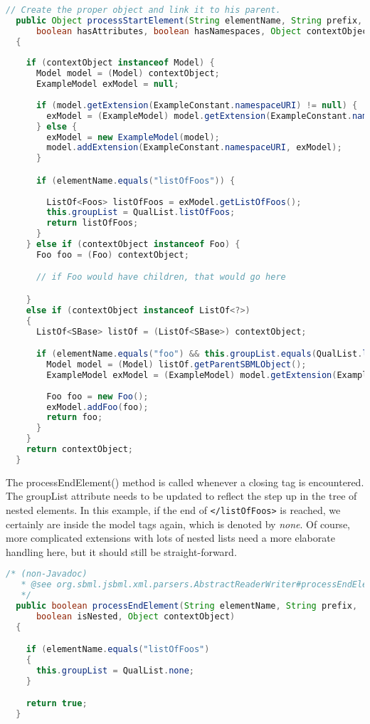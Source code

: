 \begin{lstlisting}[language=Java,caption={Extension parser: \texttt{processStartElement()}},label={lst:ModelExtParserStartElement}]
  // Create the proper object and link it to his parent.
  public Object processStartElement(String elementName, String prefix,
      boolean hasAttributes, boolean hasNamespaces, Object contextObject) 
  {
    
    if (contextObject instanceof Model) {
      Model model = (Model) contextObject;
      ExampleModel exModel = null;
      
      if (model.getExtension(ExampleConstant.namespaceURI) != null) {
        exModel = (ExampleModel) model.getExtension(ExampleConstant.namespaceURI);
      } else {
        exModel = new ExampleModel(model);
        model.addExtension(ExampleConstant.namespaceURI, exModel);
      }

      if (elementName.equals("listOfFoos")) {
          
        ListOf<Foos> listOfFoos = exModel.getListOfFoos();
        this.groupList = QualList.listOfFoos;
        return listOfFoos;
      } 
    } else if (contextObject instanceof Foo) {
      Foo foo = (Foo) contextObject;

      // if Foo would have children, that would go here

    }
    else if (contextObject instanceof ListOf<?>) 
    {
      ListOf<SBase> listOf = (ListOf<SBase>) contextObject;

      if (elementName.equals("foo") && this.groupList.equals(QualList.listOfFoos)) { 
        Model model = (Model) listOf.getParentSBMLObject();
        ExampleModel exModel = (ExampleModel) model.getExtension(ExampleConstant.namespaceURI); 
        
        Foo foo = new Foo();       
        exModel.addFoo(foo);
        return foo;
      } 
    }
    return contextObject;
  }
\end{lstlisting}

The processEndElement() method is called whenever a closing tag is encountered.
The groupList attribute needs to be updated to reflect the step up in the tree of nested elements.
In this example, if the end of \texttt{</listOfFoos>} is reached, we certainly are inside the model tags again, which is denoted by \emph{none}.
Of course, more complicated extensions with lots of nested lists need a more elaborate handling here, but it should still be straight-forward.

\begin{lstlisting}[language=Java,caption={Extension parser: \texttt{processEndElement()}},label={lst:ModelExtParserEndElement}]
  /* (non-Javadoc)
   * @see org.sbml.jsbml.xml.parsers.AbstractReaderWriter#processEndElement(java.lang.String, java.lang.String, boolean, java.lang.Object)
   */
  public boolean processEndElement(String elementName, String prefix,
      boolean isNested, Object contextObject) 
  {

    if (elementName.equals("listOfFoos")
    {
      this.groupList = QualList.none;
    }

    return true;
  }
\end{lstlisting}



